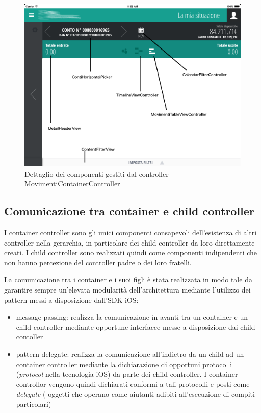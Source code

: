 \begin{figure}[!htbp]
\centering
\includegraphics[scale=0.35]{dettagli/movimenticontainer.png}
\caption{Dettaglio dei componenti gestiti dal controller MovimentiContainerController}
\label{fig:movimenticontainer}
\end{figure}

\subsection{Comunicazione tra container e child controller}
I container controller sono gli unici componenti consapevoli dell'esistenza di altri controller nella gerarchia, in particolare dei child controller da loro direttamente creati.
I child controller sono realizzati quindi come componenti indipendenti che non hanno percezione del controller padre o dei loro fratelli. 

La comunicazione tra i container e i suoi figli è stata realizzata in modo tale da garantire sempre un'elevata modularità dell'architettura mediante l'utilizzo dei pattern messi a disposizione dall'SDK iOS:

\begin{itemize}
 \item message passing: realizza la comunicazione in avanti tra un container e un child controller mediante opportune interfacce messe a disposizione dai child contoller
 \item pattern delegate: realizza la comunicazione all'indietro da un child ad un container controller mediante la dichiarazione di opportuni protocolli (\emph{protocol} nella tecnologia iOS) da parte dei child controller. I container controllor vengono quindi dichiarati conformi a tali protocolli e posti come \emph{delegate} ( oggetti che operano come aiutanti adibiti all'esecuzione di compiti particolari)
\end{itemize}

